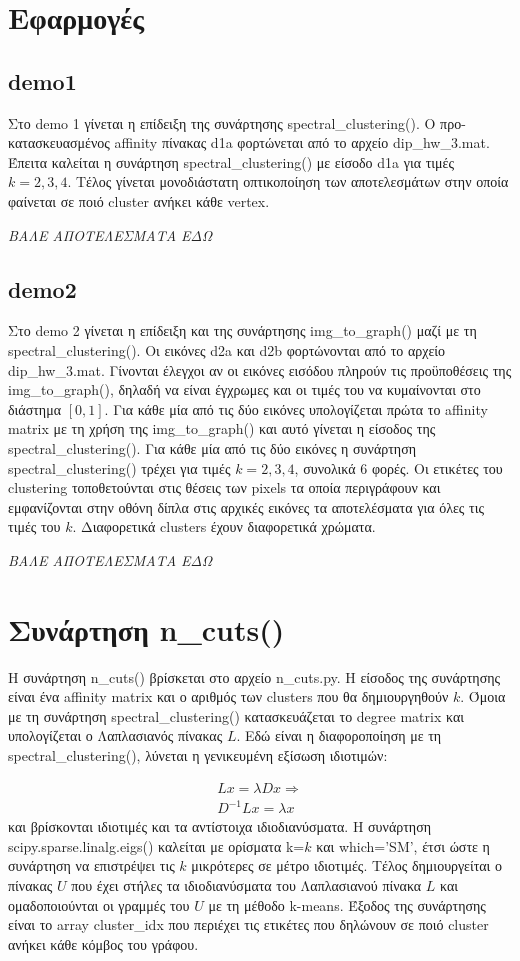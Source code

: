 \documentclass{article}
\begin{document}
\section{Εφαρμογές}
\subsection{demo1} 
Στο demo 1 γίνεται η επίδειξη της συνάρτησης spectral\_clustering(). Ο 
προ-κατασκευασμένος affinity πίνακας d1a φορτώνεται από το αρχείο dip\_hw\_3.mat. 
Έπειτα καλείται η συνάρτηση spectral\_clustering() με είσοδο d1a για τιμές $k = 2,3,4$.
Τέλος γίνεται μονοδιάστατη οπτικοποίηση των αποτελεσμάτων στην οποία φαίνεται 
σε ποιό cluster ανήκει κάθε vertex. 

\emph{ΒΑΛΕ ΑΠΟΤΕΛΕΣΜΑΤΑ ΕΔΩ}
\subsection{demo2}
Στο demo 2 γίνεται η επίδειξη και της συνάρτησης img\_to\_graph() μαζί με τη 
spectral\_clustering(). Οι εικόνες d2a και d2b φορτώνονται από το αρχείο 
dip\_hw\_3.mat. Γίνονται έλεγχοι αν οι εικόνες εισόδου πληρούν τις προϋποθέσεις 
της img\_to\_graph(), δηλαδή να είναι έγχρωμες και οι τιμές του να κυμαίνονται 
στο διάστημα $[0,1]$. Για κάθε μία από τις δύο εικόνες υπολογίζεται πρώτα το
affinity matrix με τη χρήση της img\_to\_graph() και αυτό γίνεται η είσοδος
της spectral\_clustering(). Για κάθε μία από τις δύο εικόνες η συνάρτηση 
spectral\_clustering() τρέχει για τιμές $k = 2,3,4$, συνολικά 6 φορές. Οι
ετικέτες του clustering τοποθετούνται στις θέσεις των pixels τα οποία περιγράφουν
και εμφανίζονται στην οθόνη δίπλα στις αρχικές εικόνες τα αποτελέσματα για όλες 
τις τιμές του $k$. Διαφορετικά clusters έχουν διαφορετικά χρώματα.

\emph{ΒΑΛΕ ΑΠΟΤΕΛΕΣΜΑΤΑ ΕΔΩ}
\section{Συνάρτηση n\_cuts()}
Η συνάρτηση n\_cuts() βρίσκεται στο αρχείο n\_cuts.py. Η είσοδος της συνάρτησης 
είναι ένα affinity matrix και ο αριθμός των clusters που θα δημιουργηθούν $k$.
Όμοια με τη συνάρτηση spectral\_clustering() κατασκευάζεται το degree matrix 
και υπολογίζεται ο Λαπλασιανός πίνακας $L$. Εδώ είναι η διαφοροποίηση με τη
spectral\_clustering(), λύνεται η γενικευμένη εξίσωση ιδιοτιμών:

\begin{gather}
    Lx = \lambda Dx \Rightarrow \\
    D^{-1} Lx = \lambda x
\end{gather}
και βρίσκονται ιδιοτιμές και τα αντίστοιχα ιδιοδιανύσματα. Η συνάρτηση 
scipy.sparse.linalg.eigs() καλείται με ορίσματα k=$k$ και 
which='SM', έτσι ώστε η συνάρτηση να επιστρέψει τις $k$ μικρότερες σε μέτρο
ιδιοτιμές. Τέλος δημιουργείται ο πίνακας $U$
που έχει στήλες τα ιδιοδιανύσματα του Λαπλασιανού πίνακα $L$ και ομαδοποιούνται
οι γραμμές του $U$ με τη μέθοδο k-means. Έξοδος της συνάρτησης είναι το array 
cluster\_idx που περιέχει τις ετικέτες που δηλώνουν σε ποιό cluster ανήκει κάθε
κόμβος του γράφου.
\end{document}
